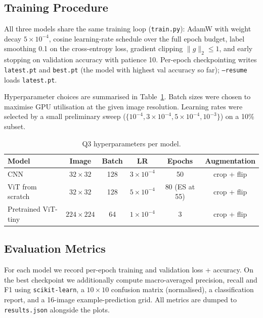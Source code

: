 \documentclass[runningheads]{llncs}
\begin{document}
\subsection{Training Procedure}

All three models share the same training loop (\texttt{train.py}):
AdamW with weight decay $5\!\times\!10^{-4}$, cosine learning-rate
schedule over the full epoch budget, label smoothing 0.1 on the
cross-entropy loss, gradient clipping $\lVert g\rVert_2 \le 1$, and
early stopping on validation accuracy with patience 10. Per-epoch
checkpointing writes \texttt{latest.pt} and \texttt{best.pt} (the
model with highest val accuracy so far); \texttt{--resume} loads
\texttt{latest.pt}.

Hyperparameter choices are summarised in Table~\ref{tab:q3_hp}. Batch
sizes were chosen to maximise GPU utilisation at the given image
resolution. Learning rates were selected by a small preliminary sweep
($\{10^{-4}, 3\!\times\!10^{-4}, 5\!\times\!10^{-4}, 10^{-3}\}$) on a
10\% subset.

\begin{table}[H]
\centering
\caption{Q3 hyperparameters per model.}
\label{tab:q3_hp}
\renewcommand{\arraystretch}{1.2}
\begin{tabular}{lccccc}
\toprule
Model & Image & Batch & LR & Epochs & Augmentation \\
\midrule
CNN                  & $32\!\times\!32$  & 128 & $3\!\times\!10^{-4}$ & 50 & crop + flip \\
ViT from scratch     & $32\!\times\!32$  & 128 & $5\!\times\!10^{-4}$ & 80 (ES at 55) & crop + flip \\
Pretrained ViT-tiny  & $224\!\times\!224$ & 64 & $1\!\times\!10^{-4}$ & 3  & crop + flip \\
\bottomrule
\end{tabular}
\end{table}

\subsection{Evaluation Metrics}

For each model we record per-epoch training and validation loss +
accuracy. On the best checkpoint we additionally compute macro-averaged
precision, recall and F1 using \texttt{scikit-learn}, a $10\times 10$
confusion matrix (normalised), a classification report, and a 16-image
example-prediction grid. All metrics are dumped to
\texttt{results.json} alongside the plots.
\end{document}
